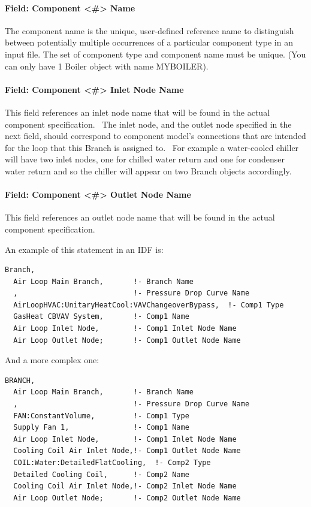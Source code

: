 \paragraph{Field: Component \textless{}\#\textgreater{} Name}\label{field-component-name-001}

The component name is the unique, user-defined reference name to distinguish between potentially multiple occurrences of a particular component type in an input file. The set of component type and component name must be unique. (You can only have 1 Boiler object with name MYBOILER).

\paragraph{Field: Component \textless{}\#\textgreater{} Inlet Node Name}\label{field-component-inlet-node-name}

This field references an inlet node name that will be found in the actual component specification.~ The inlet node, and the outlet node specified in the next field, should correspond to component model's connections that are intended for the loop that this Branch is assigned to.~ For example a water-cooled chiller will have two inlet nodes, one for chilled water return and one for condenser water return and so the chiller will appear on two Branch objects accordingly.

\paragraph{Field: Component \textless{}\#\textgreater{} Outlet Node Name}\label{field-component-outlet-node-name}

This field references an outlet node name that will be found in the actual component specification.

An example of this statement in an IDF is:

\begin{lstlisting}
Branch,
  Air Loop Main Branch,       !- Branch Name
  ,                           !- Pressure Drop Curve Name
  AirLoopHVAC:UnitaryHeatCool:VAVChangeoverBypass,  !- Comp1 Type
  GasHeat CBVAV System,       !- Comp1 Name
  Air Loop Inlet Node,        !- Comp1 Inlet Node Name
  Air Loop Outlet Node;       !- Comp1 Outlet Node Name
\end{lstlisting}

And a more complex one:

\begin{lstlisting}
BRANCH,
  Air Loop Main Branch,       !- Branch Name
  ,                           !- Pressure Drop Curve Name
  FAN:ConstantVolume,         !- Comp1 Type
  Supply Fan 1,               !- Comp1 Name
  Air Loop Inlet Node,        !- Comp1 Inlet Node Name
  Cooling Coil Air Inlet Node,!- Comp1 Outlet Node Name
  COIL:Water:DetailedFlatCooling,  !- Comp2 Type
  Detailed Cooling Coil,      !- Comp2 Name
  Cooling Coil Air Inlet Node,!- Comp2 Inlet Node Name
  Air Loop Outlet Node;       !- Comp2 Outlet Node Name
\end{lstlisting}

